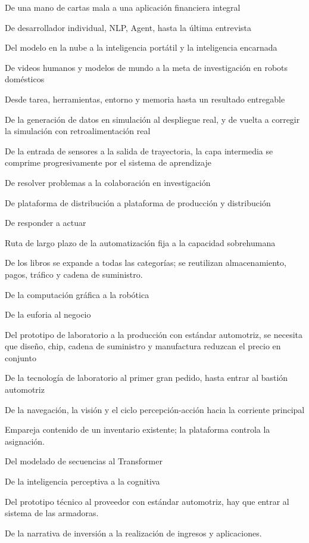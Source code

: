 \documentclass{article}
\begin{document}
De una mano de cartas mala a una aplicación financiera integral

De desarrollador individual, NLP, Agent, hasta la última entrevista

Del modelo en la nube a la inteligencia portátil y la inteligencia encarnada

De videos humanos y modelos de mundo a la meta de investigación en robots domésticos

Desde tarea, herramientas, entorno y memoria hasta un resultado entregable

De la generación de datos en simulación al despliegue real, y de vuelta a corregir la simulación con retroalimentación real

De la entrada de sensores a la salida de trayectoria, la capa intermedia se comprime progresivamente por el sistema de aprendizaje

De resolver problemas a la colaboración en investigación

De plataforma de distribución a plataforma de producción y distribución

De responder a actuar

Ruta de largo plazo de la automatización fija a la capacidad sobrehumana

De los libros se expande a todas las categorías; se reutilizan almacenamiento, pagos, tráfico y cadena de suministro.

De la computación gráfica a la robótica

De la euforia al negocio

Del prototipo de laboratorio a la producción con estándar automotriz, se necesita que diseño, chip, cadena de suministro y manufactura reduzcan el precio en conjunto

De la tecnología de laboratorio al primer gran pedido, hasta entrar al bastión automotriz

De la navegación, la visión y el ciclo percepción-acción hacia la corriente principal

Empareja contenido de un inventario existente; la plataforma controla la asignación.

Del modelado de secuencias al Transformer

De la inteligencia perceptiva a la cognitiva

Del prototipo técnico al proveedor con estándar automotriz, hay que entrar al sistema de las armadoras.

De la narrativa de inversión a la realización de ingresos y aplicaciones.
\end{document}
